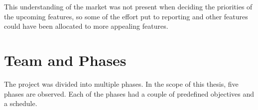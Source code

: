 This understanding of the market was not present when deciding the priorities of the upcoming features, so some of the effort put to reporting and other features could have been allocated to more appealing features.

 \section{Team and Phases}

The project was divided into multiple phases. In the scope of this thesis, five phases are observed. Each of the phases had a couple of predefined objectives and a schedule.










